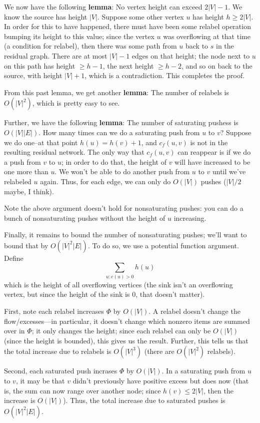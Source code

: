 \documentclass{article}
\begin{document}
We now have the following \textbf{lemma}: No vertex height can exceed
$2|V| - 1$.
We know the source has height $|V|$. Suppose some other vertex $u$ has
height $h \geq 2|V|$.
In order for this to have happened, there must have been some relabel
operation bumping its height to this value; since the vertex $u$ was
overflowing at that time (a condition for relabel), then there was some
path from $u$ back to $s$ in the residual graph.
There are at most $|V| - 1$ edges on that height; the node next to
$u$ on this path has height $\geq h-1$, the next height $\geq h-2$, and
so on back to the source, with height $|V| + 1$, which is a contradiction.
This completes the proof.

From this past lemma, we get another \textbf{lemma}: The number of 
relabels is $O(|V|^2)$, which is pretty easy to see.

Further, we have the following \textbf{lemma}:
The number of saturating pushess is $O(|V| |E|)$. How many times can we
do a saturating push from $u$ to $v$? Suppose we do one--at that point
$h(u) = h(v) + 1$, and $c_f(u,v)$ is not in the resulting residual network.
The only way that $c_f(u,v)$ can reappear is if we do a push from $v$
to $u$; in order to do that, the height of $v$ will have increased to be
one more than $u$.
We won't be able to do another push from $u$ to $v$ until we've relabeled
$u$ again.
Thus, for each edge, we can only do $O(|V|)$ pushes ($|V| / 2$ maybe, I think).

Note the above argument doesn't hold for nonsaturating pushes: you can do
a bunch of nonsaturating pushes without the height of $u$ increasing.

Finally, it remains to bound the number of nonsaturating pushes; we'll want
to bound that by $O(|V|^2|E|)$.
To do so, we use a potential function argument.
Define 
$$
\sum_{u : e(u) > 0} 
h(u)
$$
which is the height of all overflowing vertices (the sink isn't an overflowing
vertex, but since the height of the sink is 0, that doesn't matter).

First, note each relabel increases $\Phi$ by $O(|V|)$.
A relabel doesn't change the flow/excesses---in particular, it doesn't
change which  nonzero items are summed over in $\Phi$; it only changes the
height; since each relabel can only be $O(|V|)$ (since the height is
bounded), this gives us the result.
Further, this tells us that the total increase due to relabels is
$O(|V|^3)$ (there are $O(|V|^2)$ relabels).

Second, each saturated push incrases $\Phi$ by $O(|V|)$.
In a saturating push from $u$ to $v$, it may be that $v$ didn't previously
have positive excess but does now (that is, the sum can now range over
another node; since $h(v) \leq 2|V|$, then the increase is $O(|V|)$).
Thus, the total increase due to saturated pushes is $O(|V|^2|E|)$.
\end{document}

